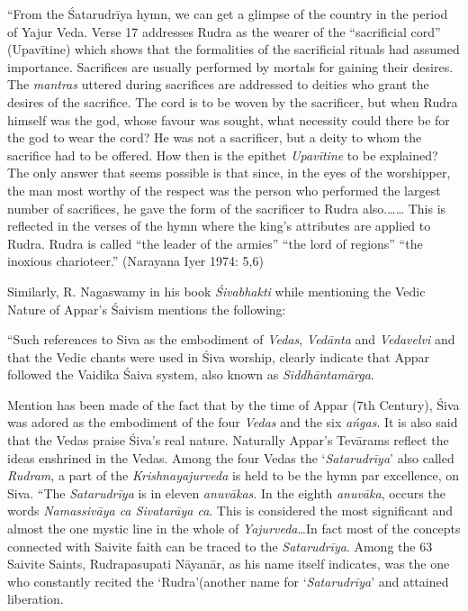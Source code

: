 \newpage

\begin{myquote}
“From the Śatarudrīya hymn, we can get a glimpse of the country in the period of Yajur Veda. Verse 17 addresses Rudra as the wearer of the “sacrificial cord” (Upavītine) which shows that the formalities of the sacrificial rituals had assumed importance. Sacrifices are usually performed by mortals for gaining their desires. The \textit{mantras} uttered during sacrifices are addressed to deities who grant the desires of the sacrifice. The cord is to be woven by the sacrificer, but when Rudra himself was the god, whose favour was sought, what necessity could there be for the god to wear the cord? He was not a sacrificer, but a deity to whom the sacrifice had to be offered. How then is the epithet \textit{Upavītine} to be explained? The only answer that seems possible is that since, in the eyes of the worshipper, the man most worthy of the respect was the person who performed the largest number of sacrifices, he gave the form of the sacrificer to Rudra also.…… This is reflected in the verses of the hymn where the king’s attributes are applied to Rudra. Rudra is called “the leader of the armies” “the lord of regions” “the inoxious charioteer.” (Narayana Iyer 1974: 5,6)
\end{myquote}

Similarly, R. Nagaswamy in his book \textit{Śivabhakti} while mentioning the Vedic Nature of Appar’s Śaivism mentions the following:

\begin{myquote}
“Such references to Siva as the embodiment of \textit{Vedas}, \textit{Vedānta} and \textit{Vedavelvi} and that the Vedic chants were used in Śiva worship, clearly indicate that Appar followed the Vaidika Śaiva system, also known as \textit{Siddhāntamārga}.
\end{myquote}

\begin{myquote}
Mention has been made of the fact that by the time of Appar (7th Century), Śiva was adored as the embodiment of the four \textit{Vedas} and the six \textit{ańgas}. It is also said that the Vedas praise Śiva’s real nature. Naturally Appar’s Tevārams reflect the ideas enshrined in the Vedas. Among the four Vedas the ‘\textit{Satarudrīya}’ also called \textit{Rudram}, a part of the \textit{Krishnayajurveda} is held to be the hymn par excellence, on Siva. “The \textit{Satarudrīya} is in eleven \textit{anuvākas}. In the eighth \textit{anuvāka}, occurs the words \textit{Namassivāya ca Sivatarāya ca}. This is considered the most significant and almost the one mystic line in the whole of \textit{Yajurveda}…In fact most of the concepts connected with Saivite faith can be traced to the \textit{Satarudrīya}. Among the 63 Saivite Saints, Rudrapasupati Nāyanār, as his name itself indicates, was the one who constantly recited the ‘Rudra’(another name for ‘\textit{Satarudrīya}’ and attained liberation.
\end{myquote}

